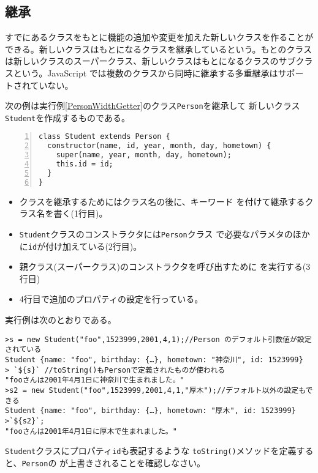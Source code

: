 \subsection{継承}
すでにあるクラスをもとに機能の追加や変更を加えた新しいクラスを作ることが
できる。新しいクラスはもとになるクラスを継承しているという。もとのクラス
は新しいクラスのスーパークラス、新しいクラスはもとになるクラスのサブクラ
スという。JavaScript では複数のクラスから同時に継承する多重継承はサポー
トされていない。
 \begin{Exec}\upshape\label{Inheritance}
  次の例は実行例\ref{PersonWidthGetter}のクラス\texttt{Person}を継承して
  新しいクラス\texttt{Student}を作成するものである。
\begin{Verbatim}[numbers=left]
class Student extends Person {
  constructor(name, id, year, month, day, hometown) {
    super(name, year, month, day, hometown);
    this.id = id;
  }
}
\end{Verbatim}
  \begin{itemize}
   \item クラスを継承するためにはクラス名の後に、キーワード
         を付けて継承するクラス名を書く(1行目)。
   \item \texttt{Student}クラスのコンストラクタには\texttt{Person}クラス
         で必要なパラメタのほかに\texttt{id}が付け加えている(2行目)。
   \item 親クラス(スーパークラス)のコンストラクタを呼び出すために
         を実行する(3行目)
   \item 4行目で追加のプロパティの設定を行っている。
  \end{itemize}
 \end{Exec}
 実行例は次のとおりである。
\begin{Verbatim}
>s = new Student("foo",1523999,2001,4,1);//Person のデフォルト引数値が設定されている
Student {name: "foo", birthday: {…}, hometown: "神奈川", id: 1523999}
> `${s}` //toString()もPersonで定義されたものが使われる
"fooさんは2001年4月1日に神奈川で生まれました。"
>s2 = new Student("foo",1523999,2001,4,1,"厚木");//デフォルト以外の設定もできる
Student {name: "foo", birthday: {…}, hometown: "厚木", id: 1523999}
>`${s2}`;
"fooさんは2001年4月1日に厚木で生まれました。"
\end{Verbatim}
\begin{Prob}\upshape
\texttt{Student}クラスにプロパティ\texttt{id}も表記するような
 \texttt{toString()}メソッドを定義すると、\texttt{Person}の
 が上書きされることを確認しなさい。
\end{Prob}
